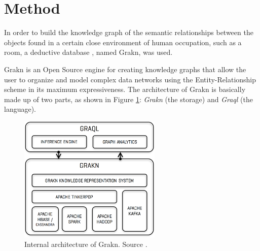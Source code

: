 \section{Method}
\label{sec:metodo}

In order to build the knowledge graph of the semantic relationships between the objects found in a certain close environment of human occupation, such as a room, a deductive database \cite{stichbury}, named Grakn, was used.

Grakn is an Open Source engine for creating knowledge graphs that allow the user to organize and model complex data networks using the Entity-Relationship scheme in its maximum expressiveness. The architecture of Grakn is basically made up of two parts, as shown in Figure \ref{fig:arch}: \textit{Grakn} (the storage) and \textit{Graql} (the language).

\begin{figure}[H]
    \centering
    \includegraphics[width=6.8cm]{figures/architecture}
    \caption{Internal architecture of Grakn.
    Source \cite{stichbury}.}
    \label{fig:arch}
\end{figure}

